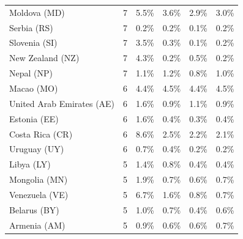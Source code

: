 {\begin{table}[ht]
{\begin{tabular}{lccccc}
Moldova (MD)          &     7  & \cellcolor{red0} 5.5\% & 3.6\% & 2.9\% & 3.0\% \\  %
Serbia (RS)           &     7  & 0.2\% & 0.2\% & 0.1\% & 0.2\% \\  %
Slovenia (SI)         &     7  & \cellcolor{red5}  3.5\% & \cellcolor{green0} 0.3\% & \cellcolor{green0} 0.1\% & \cellcolor{green0} 0.2\% \\  %
New Zealand (NZ)      &     7  & \cellcolor{red5}  4.3\% & \cellcolor{green0} 0.2\% & \cellcolor{green0} 0.5\% & \cellcolor{green0} 0.2\% \\  %
Nepal (NP)            &     7  & 1.1\% & 1.2\% & \cellcolor{green0} 0.8\% & 1.0\% \\  %
Macao (MO)            &     6  & 4.4\% & 4.5\% & 4.4\% & \cellcolor{red0} 4.5\% \\  %
United Arab Emirates (AE)  &     6  & \cellcolor{red5}  1.6\% & \cellcolor{green1} 0.9\% & 1.1\% & \cellcolor{green1} 0.9\% \\  %
Estonia (EE)          &     6  & \cellcolor{red1} 1.6\% & 0.4\% & \cellcolor{green0} 0.3\% & 0.4\% \\  %
Costa Rica (CR)       &     6  & \cellcolor{red1} 8.6\% & 2.5\% & \cellcolor{green0} 2.2\% & \cellcolor{green0} 2.1\% \\  %
Uruguay (UY)          &     6  & \cellcolor{red2} 0.7\% & 0.4\% & \cellcolor{green0} 0.2\% & \cellcolor{green1} 0.2\% \\  %
Libya (LY)            &     5  & \cellcolor{red1} 1.4\% & 0.8\% & \cellcolor{green0} 0.4\% & \cellcolor{green0} 0.4\% \\  %
Mongolia (MN)         &     5  & \cellcolor{red2} 1.9\% & \cellcolor{green0} 0.7\% & \cellcolor{green0} 0.6\% & \cellcolor{green0} 0.7\% \\  %
Venezuela (VE)        &     5  & \cellcolor{red5}  6.7\% & 1.6\% & \cellcolor{green0} 0.8\% & \cellcolor{green0} 0.7\% \\  %
Belarus (BY)          &     5  & \cellcolor{red0} 1.0\% & 0.7\% & \cellcolor{green0} 0.4\% & 0.6\% \\  %
Armenia (AM)          &     5  & \cellcolor{red0} 0.9\% & 0.6\% & 0.6\% & 0.7\% \\  %

\end{tabular}}
\end{table}}
